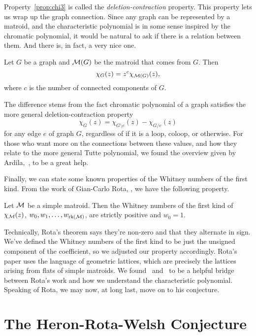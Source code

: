 \documentclass[12pt,oneside]{../../sfsuthesis}
\begin{document}
Property~\ref{prop:chi3} is called the \emph{deletion-contraction} property.
This property lets us wrap up the graph connection.
Since any graph can be represented by a matroid, and the characteristic polynomial is in some sense inspired by the chromatic polynomial, it would be natural to ask if there is a relation between them.
And there is, in fact, a very nice one.

\begin{proposition}
    Let \( G \) be a graph and \( \mathcal{M}(G) \) be the matroid that comes from \( G \).
    Then
    \[
        \chi_G(z) = z^c \chi_{\mathcal{M}(G)}(z),
    \]
    where \( c \) is the number of connected components of \( G \).
\end{proposition}

The difference stems from the fact chromatic polynomial of a graph satisfies the more general deletion-contraction property
\[
    \chi_G(z) = \chi_{G \setminus e}(z) - \chi_{G / e}(z)
\]
for any edge \( e \) of graph \( G \), regardless of if it is a loop, coloop, or otherwise.
For those who want more on the connections between these values, and how they relate to the more general Tutte polynomial, we found the overview given by Ardila,~\cite{ardilaTuttePolynomialsHyperplane2022}, to be a great help.

Finally, we can state some known properties of the Whitney numbers of the first kind.
From the work of Gian-Carlo Rota, \cite[Theorem~4]{rotaFoundationsCombinatorialTheory1964}, we have the following property.
\begin{proposition}\th\label{thm:whitneyPositive}
    Let \( \mathcal{M} \) be a simple matroid.
    Then the Whitney numbers of the first kind of \( \chi_{\mathcal{M}}(z) \), \( w_0, w_1, \dots, w_{\operatorname{rk}(\mathcal{M})} \), are strictly positive and \( w_0 = 1 \).
\end{proposition}
Technically, Rota's theorem says they're non-zero and that they alternate in sign.
We've defined the Whitney numbers of the first kind to be just the unsigned component of the coefficient, so we adjusted our property accordingly.
Rota's paper uses the language of geometric lattices, which are precisely the lattices arising from flats of simple matroids.
We found~\cite{zaslavskyMobiusFunctionCharacteristic1987} and~\cite{aignerWhitneyNumbers1987} to be a helpful bridge between Rota's work and how we understand the characteristic polynomial.
Speaking of Rota, we may now, at long last, move on to his conjecture.

\section{The Heron-Rota-Welsh Conjecture}
\end{document}
